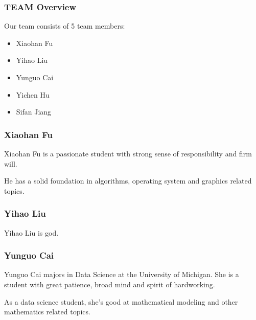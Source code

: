 \documentclass[xcolor=table]{beamer}
\begin{document}
\begin{mdframe}%

\frametitle{TEAM Overview}\label{heading-sec-team-overview}%

\noindent{}Our team consists of 5 team members:%

\begin{itemize}[noitemsep,topsep=\mdcompacttopsep]%

\item{}Xiaohan Fu%

\item{}Yihao Liu%

\item{}Yunguo Cai%

\item{}Yichen Hu%

\item{}Sifan Jiang%
\end{itemize}%
\end{mdframe}\label{sec-team-overview}%

\begin{mdframe}%

\frametitle{Xiaohan Fu}\label{heading-sec-xiaohan-fu}%

\noindent{}Xiaohan Fu is a passionate student with strong sense of responsibility and firm will.%

He has a solid foundation in algorithms, operating system and graphics related topics.%
\end{mdframe}\label{sec-xiaohan-fu}%

\begin{mdframe}%

\frametitle{Yihao Liu}\label{heading-sec-yihao-liu}%

\noindent{}Yihao Liu is god.%
\end{mdframe}\label{sec-yihao-liu}%

\begin{mdframe}%

\frametitle{Yunguo Cai}\label{heading-sec-yunguo-cai}%

\noindent{}Yunguo Cai majors in Data Science at the University of Michigan. She is a student with great patience, broad mind and spirit of hardworking.%

As a data science student, she's good at mathematical modeling and other mathematics related topics.%
\end{mdframe}\label{sec-yunguo-cai}%
\end{document}
